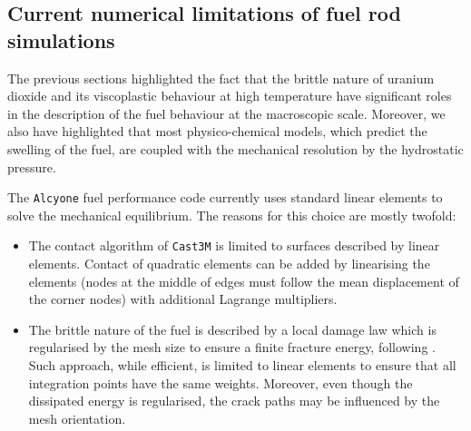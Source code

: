 
\subsection{Current numerical limitations of fuel rod simulations}

The previous sections highlighted the fact that the brittle nature of
uranium dioxide and its viscoplastic behaviour at high temperature have
significant roles in the description of the fuel behaviour at the
macroscopic scale. Moreover, we also have highlighted that most
physico-chemical models, which predict the swelling of the fuel, are
coupled with the mechanical resolution by the hydrostatic pressure.

The \texttt{Alcyone} fuel performance code currently uses standard linear
elements to solve the mechanical equilibrium. The reasons for this
choice are mostly twofold:

\begin{itemize}
  \item The contact algorithm of \texttt{Cast3M} is limited to surfaces described by
  linear elements. Contact of quadratic elements can be added by
  linearising the elements (nodes at the middle of edges must follow the
  mean displacement of the corner nodes) with additional Lagrange
  multipliers.
  \item The brittle nature of the fuel is described by a local damage law
  \cite{michel_new_2017} which is regularised by the mesh size to ensure a
  finite fracture energy, following \cite{hillerborg_analysis_1976}. Such
  approach, while efficient, is limited to linear elements to ensure
  that all integration points have the same weights. Moreover, even
  though the dissipated energy is regularised, the crack paths may be
  influenced by the mesh orientation.
\end{itemize}


